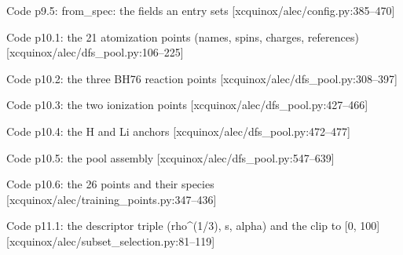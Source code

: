 \begin{frame}[allowframebreaks]{Code p9.5: from\_spec: the fields an entry sets [xcquinox/alec/config.py:385--470]}
\label{code:p9_5_from_spec_the_fields_an_entry_sets}
\end{frame}
\begin{frame}[allowframebreaks]{Code p10.1: the 21 atomization points (names, spins, charges, references) [xcquinox/alec/dfs\_pool.py:106--225]}
\label{code:p10_1_the_21_atomization_points_names_spins_ch}
\end{frame}
\begin{frame}[allowframebreaks]{Code p10.2: the three BH76 reaction points [xcquinox/alec/dfs\_pool.py:308--397]}
\label{code:p10_2_the_three_bh76_reaction_points}
\end{frame}
\begin{frame}[allowframebreaks]{Code p10.3: the two ionization points [xcquinox/alec/dfs\_pool.py:427--466]}
\label{code:p10_3_the_two_ionization_points}
\end{frame}
\begin{frame}[allowframebreaks]{Code p10.4: the H and Li anchors [xcquinox/alec/dfs\_pool.py:472--477]}
\label{code:p10_4_the_h_and_li_anchors}
\end{frame}
\begin{frame}[allowframebreaks]{Code p10.5: the pool assembly [xcquinox/alec/dfs\_pool.py:547--639]}
\label{code:p10_5_the_pool_assembly}
\end{frame}
\begin{frame}[allowframebreaks]{Code p10.6: the 26 points and their species [xcquinox/alec/training\_points.py:347--436]}
\label{code:p10_6_the_26_points_and_their_species}
\end{frame}
\begin{frame}[allowframebreaks]{Code p11.1: the descriptor triple (rho\^{}(1/3), s, alpha) and the clip to [0, 100] [xcquinox/alec/subset\_selection.py:81--119]}
\label{code:p11_1_the_descriptor_triple_rho_1_3_s_alpha_an}
\end{frame}
